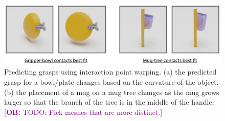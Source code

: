 \documentclass{article}
\newcommand{\ob}[1]{\textcolor{purple}{[\textbf{OB:} #1]}}
\newcommand{\pcx}[1]{\mathrm{X}^{(#1)}}
\begin{document}
\begin{figure}
    \centering
    \includegraphics[width=\textwidth]{figures/picks_and_places.pdf}
    \caption{Predicting grasps using interaction point warping. (a) the predicted grasp for a bowl/plate changes based on the curvature of the object. (b) the placement of a mug on a mug tree changes as the mug grows larger so that the branch of the tree is in the middle of the handle. \ob{TODO: Pick meshes that are more distinct.}}
    \label{fig:grasps_and_placements}
\end{figure}


\end{document}
